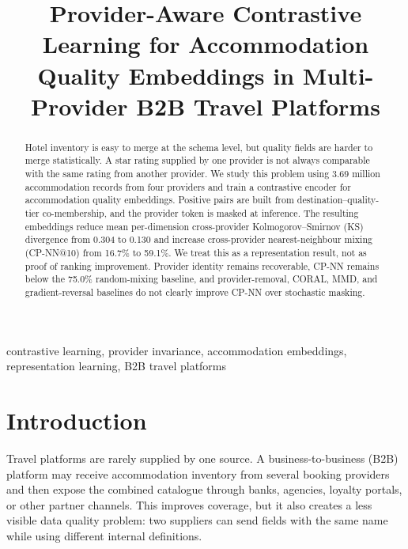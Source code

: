 \documentclass[conference,a4paper]{IEEEtran}
\begin{document}
\title{Provider-Aware Contrastive Learning for Accommodation Quality Embeddings in Multi-Provider B2B Travel Platforms}


\maketitle

\begin{abstract}
Hotel inventory is easy to merge at the schema level, but quality fields are harder to merge statistically. A star rating supplied by one provider is not always comparable with the same rating from another provider. We study this problem using 3.69 million accommodation records from four providers and train a contrastive encoder for accommodation quality embeddings. Positive pairs are built from destination--quality-tier co-membership, and the provider token is masked at inference. The resulting embeddings reduce mean per-dimension cross-provider Kolmogorov--Smirnov (KS) divergence from 0.304 to 0.130 and increase cross-provider nearest-neighbour mixing (CP-NN@10) from 16.7\% to 59.1\%. We treat this as a representation result, not as proof of ranking improvement. Provider identity remains recoverable, CP-NN remains below the 75.0\% random-mixing baseline, and provider-removal, CORAL, MMD, and gradient-reversal baselines do not clearly improve CP-NN over stochastic masking.
\end{abstract}

\begin{IEEEkeywords}
contrastive learning, provider invariance, accommodation embeddings, representation learning, B2B travel platforms
\end{IEEEkeywords}

\section{Introduction}

Travel platforms are rarely supplied by one source. A business-to-business (B2B) platform may receive accommodation inventory from several booking providers and then expose the combined catalogue through banks, agencies, loyalty portals, or other partner channels. This improves coverage, but it also creates a less visible data quality problem: two suppliers can send fields with the same name while using different internal definitions.
\end{document}
